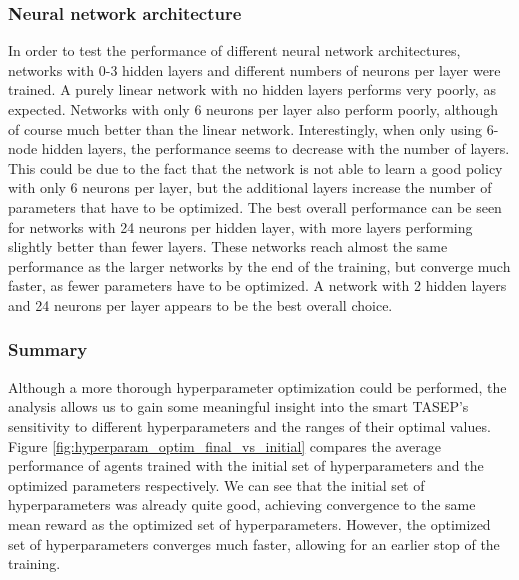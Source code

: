 \subsubsection{Neural network architecture}
In order to test the performance of different neural network architectures, networks with 0-3 hidden layers and different numbers of neurons per layer were trained. A purely linear network with no hidden layers performs very poorly, as expected. Networks with only 6 neurons per layer also perform poorly, although of course much better than the linear network. Interestingly, when only using 6-node hidden layers, the performance seems to decrease with the number of layers. This could be due to the fact that the network is not able to learn a good policy with only 6 neurons per layer, but the additional layers increase the number of parameters that have to be optimized. The best overall performance can be seen for networks with 24 neurons per hidden layer, with more layers performing slightly better than fewer layers. These networks reach almost the same performance as the larger networks by the end of the training, but converge much faster, as fewer parameters have to be optimized. A network with 2 hidden layers and 24 neurons per layer appears to be the best overall choice.

\subsubsection{Summary}
Although a more thorough hyperparameter optimization could be performed, the analysis allows us to gain some meaningful insight into the smart TASEP's sensitivity to different hyperparameters and the ranges of their optimal values. Figure \ref{fig:hyperparam_optim_final_vs_initial} compares the average performance of agents trained with the initial set of hyperparameters and the optimized parameters respectively. We can see that the initial set of hyperparameters was already quite good, achieving convergence to the same mean reward as the optimized set of hyperparameters. However, the optimized set of hyperparameters converges much faster, allowing for an earlier stop of the training.


